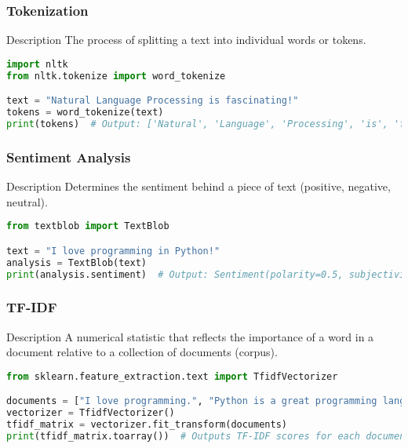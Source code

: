 \documentclass[aspectratio=169]{beamer}
\begin{document}
\begin{frame}[fragile]
    \frametitle{Tokenization}
    \begin{block}{Description}
        The process of splitting a text into individual words or tokens.
    \end{block}
    \begin{lstlisting}[language=Python]
import nltk
from nltk.tokenize import word_tokenize

text = "Natural Language Processing is fascinating!"
tokens = word_tokenize(text)
print(tokens)  # Output: ['Natural', 'Language', 'Processing', 'is', 'fascinating', '!']
    \end{lstlisting}
\end{frame}

\begin{frame}[fragile]
    \frametitle{Sentiment Analysis}
    \begin{block}{Description}
        Determines the sentiment behind a piece of text (positive, negative, neutral).
    \end{block}
    \begin{lstlisting}[language=Python]
from textblob import TextBlob

text = "I love programming in Python!"
analysis = TextBlob(text)
print(analysis.sentiment)  # Output: Sentiment(polarity=0.5, subjectivity=0.6)
    \end{lstlisting}
\end{frame}

\begin{frame}[fragile]
    \frametitle{TF-IDF}
    \begin{block}{Description}
        A numerical statistic that reflects the importance of a word in a document relative to a collection of documents (corpus).
    \end{block}
    \begin{lstlisting}[language=Python]
from sklearn.feature_extraction.text import TfidfVectorizer

documents = ["I love programming.", "Python is a great programming language."]
vectorizer = TfidfVectorizer()
tfidf_matrix = vectorizer.fit_transform(documents)
print(tfidf_matrix.toarray())  # Outputs TF-IDF scores for each document
    \end{lstlisting}
\end{frame}
\end{document}
